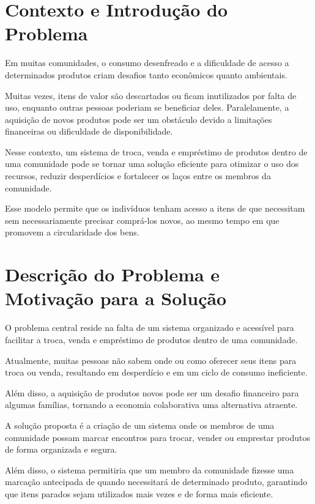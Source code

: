 \documentclass[a4paper, 12pt]{article} %
\begin{document}

\section*{Contexto e Introdução do Problema}

Em muitas comunidades, o consumo desenfreado e a dificuldade de acesso a determinados produtos criam desafios tanto econômicos quanto ambientais. 

Muitas vezes, itens de valor são descartados ou ficam inutilizados por falta de uso, enquanto outras pessoas poderiam se beneficiar deles. Paralelamente, a aquisição de novos produtos pode ser um obstáculo devido a limitações financeiras ou dificuldade de disponibilidade.

Nesse contexto, um sistema de troca, venda e empréstimo de produtos dentro de uma comunidade pode se tornar uma solução eficiente para otimizar o uso dos recursos, reduzir desperdícios e fortalecer os laços entre os membros da comunidade. 

Esse modelo permite que os indivíduos tenham acesso a itens de que necessitam sem necessariamente precisar comprá-los novos, ao mesmo tempo em que promovem a circularidade dos bens.

\section*{Descrição do Problema e Motivação para a Solução}

O problema central reside na falta de um sistema organizado e acessível para facilitar a troca, venda e empréstimo de produtos dentro de uma comunidade. 

Atualmente, muitas pessoas não sabem onde ou como oferecer seus itens para troca ou venda, resultando em desperdício e em um ciclo de consumo ineficiente. 

Além disso, a aquisição de produtos novos pode ser um desafio financeiro para algumas famílias, tornando a economia colaborativa uma alternativa atraente.

A solução proposta é a criação de um sistema onde os membros de uma comunidade possam marcar encontros para trocar, vender ou emprestar produtos de forma organizada e segura. 

Além disso, o sistema permitiria que um membro da comunidade fizesse uma marcação antecipada de quando necessitará de determinado produto, garantindo que itens parados sejam utilizados mais vezes e de forma mais eficiente. 
\end{document}
